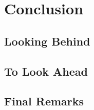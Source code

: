 
\chapter{Conclusion}\label{ch:conclusion}

\section{Looking Behind}

\section{To Look Ahead}

\section{Final Remarks}